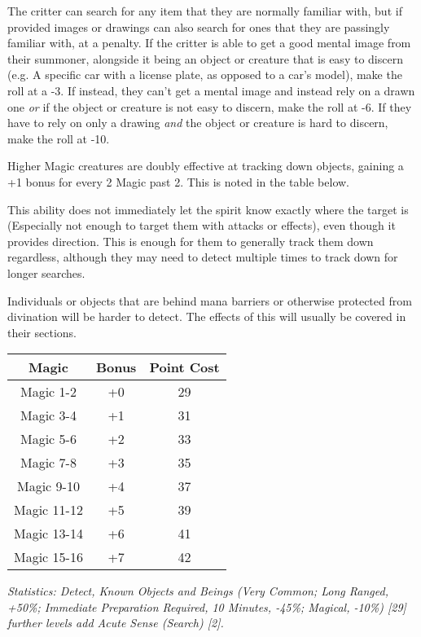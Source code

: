 \begin{multicols*}{3}
	The critter can search for any item that they are normally familiar with, but if provided images or drawings can also search for ones that they are passingly familiar with, at a penalty. If the critter is able to get a good mental image from their summoner, alongside it being an object or creature that is easy to discern (e.g. A specific car with a license plate, as opposed to a car's model), make the roll at a -3. If instead, they can't get a mental image and instead rely on a drawn one \textit{or} if the object or creature is not easy to discern, make the roll at -6. If they have to rely on only a drawing \textit{and} the object or creature is hard to discern, make the roll at -10.
	
	Higher Magic creatures are doubly effective at tracking down objects, gaining a +1 bonus for every 2 Magic past 2. This is noted in the table below.
	
	This ability does not immediately let the spirit know exactly where the target is (Especially not enough to target them with attacks or effects), even though it provides direction. This is enough for them to generally track them down regardless, although they may need to detect multiple times to track down for longer searches.
	
	Individuals or objects that are behind mana barriers or otherwise protected from divination will be harder to detect. The effects of this will usually be covered in their sections. 
	
	\begin{center}
		\begin{tabular}{|c|c|c|}
			\hline
			Magic & Bonus & Point Cost\\
			\hline
			\hline
			Magic 1-2 & +0 & 29 \\
			Magic 3-4 & +1 & 31 \\
			Magic 5-6 & +2 & 33 \\
			Magic 7-8 & +3 & 35 \\
			Magic 9-10 & +4 & 37 \\
			Magic 11-12 & +5 & 39 \\
			Magic 13-14 & +6 & 41 \\
			Magic 15-16 & +7 & 42 \\
			\hline
		\end{tabular}
	\end{center}
	
	\textcolor{OliveGreen}{\textit{Statistics: Detect, Known Objects and Beings (Very Common; Long Ranged, +50\%; Immediate Preparation Required, 10 Minutes, -45\%; Magical, -10\%) [29] further levels add Acute Sense (Search) [2].}}
	

\end{multicols*}
